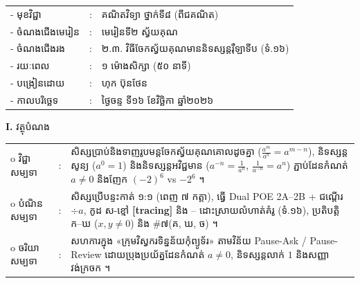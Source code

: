 \documentclass[a4paper,10pt]{article}
\newcommand{\wcirc}{{\CourierBullet\fontsize{9.5pt}{11pt}\selectfont o}}
\newcommand{\en}[1]{{\TimesEn #1}}
\newcommand{\cnum}[1]{{\fontsize{10.5pt}{12pt}\selectfont\ding{\numexpr181+#1\relax}}\hspace{0.15em}}
\begin{document}
{\renewcommand{\arraystretch}{1.02}
\hspace*{4.15cm}%
\begin{tabular}{@{}l l l@{}}
  - \hspace{0.35cm} មុខវិជ្ជា & : & គណិតវិទ្យា ថ្នាក់ទី៨ (ពីជគណិត) \\
  - \hspace{0.35cm} ចំណងជើងមេរៀន & : & មេរៀនទី២ ស្វ័យគុណ \\
  - \hspace{0.35cm} ចំណងជើងរង & : & ២.៣. វិធីចែកស្វ័យគុណមាននិទស្សន្តរ៉ឺឡាទីប (ទំ.១៦) \\
  - \hspace{0.35cm} រយៈពេល & : & ១ ម៉ោងសិក្សា (៥០ នាទី) \\
  - \hspace{0.35cm} បង្រៀនដោយ & : & ហុក ប៊ុនថែន \\
  - \hspace{0.35cm} កាលបរិច្ឆេទ & : & ថ្ងៃចន្ទ ទី១៦ ខែវិច្ឆិកា ឆ្នាំ២០២៦ \\
\end{tabular}

\vspace{2pt}

\textbf{I.} {\muol វត្ថុបំណង}\\[1pt]
\hspace*{0.55cm}%
\begin{tabular}{@{}l l L{14.2cm}@{}}
  \wcirc \hspace{0.25cm} វិជ្ជាសម្បទា & : & សិស្សប្រាប់និងទាញរូបមន្តចែកស្វ័យគុណគោលដូចគ្នា ($\frac{a^m}{a^n}=a^{m-n}$), និទស្សន្តសូន្យ ($a^0=1$) និងនិទស្សន្តអវិជ្ជមាន ($a^{-n}=\frac{1}{a^n}$, $\frac{1}{a^{-n}}=a^n$) ភ្ជាប់ដែនកំណត់ $a\neq 0$ និងញែក $(-2)^6$ vs $-2^6$ ។ \\
  \wcirc \hspace{0.25cm} បំណិនសម្បទា & : & សិស្សប្រើបន្ទះកាត់ ១:១ (ពេញ ៧ កត្តា), ធ្វើ \en{Dual POE 2A--2B} + ជណ្ដើរ $\div a$, កូដ ស-ខ្មៅ \textbf{[tracing]} និង \cnum{1}--\cnum{5} ដោះស្រាយលំហាត់គំរូ (ទំ.១៦), ប្រតិបត្តិ ក--ឃ ($x,y\neq 0$) និង \#៧(គ, ឃ, ច) ។ \\
  \wcirc \hspace{0.25cm} ចរិយាសម្បទា & : & សហការក្នុង «ក្រុមវិស្វករទិន្នន័យកុំព្យូទ័រ» តាមវិន័យ \en{Pause-Ask / Pause-Review} ដោយប្រុងប្រយ័ត្នដែនកំណត់ $a\neq 0$, និទស្សន្តលាក់ $1$ និងសញ្ញាវង់ក្រចក ។ \\
\end{tabular}

}
\end{document}
